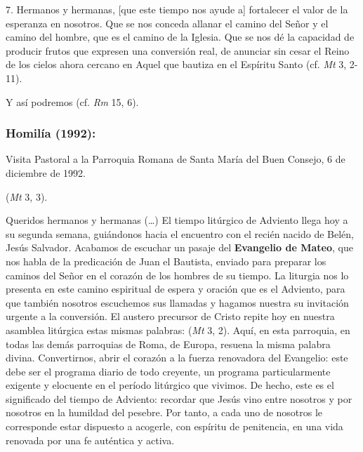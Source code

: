 \begin{body}
\begin{body}
	7. Hermanos y hermanas, {[}que este tiempo nos ayude a{]} fortalecer el valor de la esperanza en nosotros. Que se nos conceda allanar el camino del Señor y el camino del hombre, que es el camino de la Iglesia. Que se nos dé la capacidad de producir frutos que expresen una conversión real, de anunciar sin cesar el Reino de los cielos ahora cercano en Aquel que bautiza en el Espíritu Santo (cf. \emph{Mt} 3, 2-11).
	
	Y así podremos  (cf. \emph{Rm} 15, 6).
\end{body}

\subsubsection{Homilía (1992):}

Visita Pastoral a la Parroquia Romana de Santa María del Buen Consejo, 6 de diciembre de 1992.

\begin{body}
	 (\emph{Mt} 3, 3).
	
	Queridos hermanos y hermanas (\ldots{}) El tiempo litúrgico de Adviento llega hoy a su segunda semana, guiándonos hacia el encuentro con el recién nacido de Belén, Jesús Salvador. Acabamos de escuchar un pasaje del \textbf{Evangelio de Mateo}, que nos habla de la predicación de Juan el Bautista, enviado para preparar los caminos del Señor en el corazón de los hombres de su tiempo. La liturgia nos lo presenta en este camino espiritual de espera y oración que es el Adviento, para que también nosotros escuchemos sus llamadas y hagamos nuestra su invitación urgente a la conversión. El austero precursor de Cristo repite hoy en nuestra asamblea litúrgica estas mismas palabras:  (\emph{Mt} 3, 2). Aquí, en esta parroquia, en todas las demás parroquias de Roma, de Europa, resuena la misma palabra divina. Convertirnos, abrir el corazón a la fuerza renovadora del Evangelio: este debe ser el programa diario de todo creyente, un programa particularmente exigente y elocuente en el período litúrgico que vivimos. De hecho, este es el significado del tiempo de Adviento: recordar que Jesús vino entre nosotros y por nosotros en la humildad del pesebre. Por tanto, a cada uno de nosotros le corresponde estar dispuesto a acogerle, con espíritu de penitencia, en una vida renovada por una fe auténtica y activa.
	

\end{body}
\end{body}
